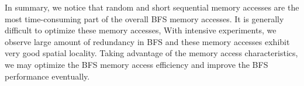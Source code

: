 %

In summary, we notice that random and short sequential memory accesses 
are the most time-consuming part of the overall BFS memory accesses. 
It is generally difficult to optimize these memory accesses, 
With intensive experiments, we observe large amount of redundancy in BFS and 
these memory accesses exhibit very good spatial locality. Taking advantage of the 
memory access characteristics, we may optimize the BFS memory access efficiency 
and improve the BFS performance eventually.

